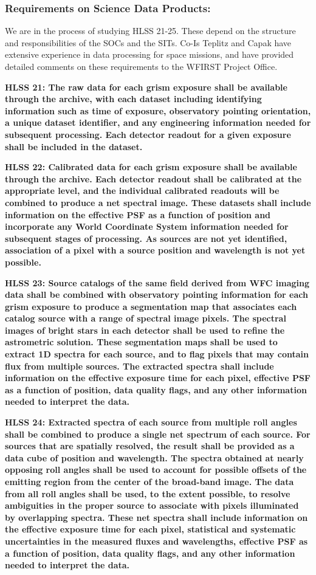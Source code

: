  \subsubsection{Requirements on Science Data Products:}


 We are in the process of studying HLSS 21-25. These depend on the structure and
 responsibilities of the SOCs and the SITs. Co-Is Teplitz and Capak have extensive
 experience in data processing for space missions, and have provided detailed comments
 on these requirements to the WFIRST Project Office.

 \noindent
 {\bf HLSS 21: The raw data for each grism exposure shall be available through the
 archive, with each dataset including identifying information such as time of
 exposure, observatory pointing orientation, a unique dataset identifier, and any
 engineering information needed for subsequent processing. Each detector readout
 for a given exposure shall be included in the dataset. }

 \noindent
 {\bf HLSS 22: Calibrated data for each grism exposure shall be available through the
 archive. Each detector readout shall be calibrated at the appropriate level, and
 the individual calibrated readouts will be combined to produce a net spectral
 image. These datasets shall include information on the effective PSF as a
 function of position and incorporate any World Coordinate System information
 needed for subsequent stages of processing. As sources are not yet identified,
 association of a pixel with a source position and wavelength is not yet
 possible.}

 \noindent
 {\bf HLSS 23: Source catalogs of the same field derived from WFC imaging data shall
 be combined with observatory pointing information for each grism exposure to
 produce a segmentation map that associates each catalog source with a range of
 spectral image pixels. The spectral images of bright stars in each detector
 shall be used to refine the astrometric solution.  These segmentation maps shall
 be used to extract 1D spectra for each source, and to flag pixels that may
 contain flux from multiple sources. The extracted spectra shall include
 information on the effective exposure time for each pixel, effective PSF as a
 function of position, data quality flags, and any other information needed to
 interpret the data.}

 \noindent
 {\bf HLSS 24: Extracted spectra of each source from multiple roll angles shall be
 combined to produce a single net spectrum of each source. For sources that are
 spatially resolved, the result shall be provided as a data cube of position and
 wavelength. The spectra obtained at nearly opposing roll angles shall be used to
 account for possible offsets of the emitting region from the center of the
 broad-band image. The data from all roll angles shall be used, to the extent
 possible, to resolve ambiguities in the proper source to associate with pixels
 illuminated by overlapping spectra. These net spectra shall include information
 on the effective exposure time for each pixel, statistical and systematic
 uncertainties in the measured fluxes and wavelengths, effective PSF as a
 function of position, data quality flags, and any other information needed to
 interpret the data. }

